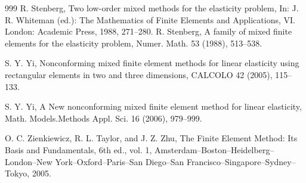 \documentclass{amsart}
\numberwithin{table}{section}
\numberwithin{figure}{section}
\begin{document}
\begin{thebibliography}{999}
     R. Stenberg, Two low-order mixed methods for the elasticity problem,
     In: J. R. Whiteman (ed.):
     The Mathematics of Finite Elements and Applications, VI. London:
     Academic Press, 1988, 271--280.
 R. Stenberg,
   A family of mixed finite elements for the elasticity problem,
    Numer. Math. 53 (1988),   513--538.



 S. Y. Yi,
    Nonconforming mixed finite element methods for
       linear elasticity using rectangular
     elements in two and three dimensions,
      CALCOLO 42 (2005), 115--133.

 S. Y. Yi,
    A New nonconforming mixed finite element method for linear elasticity,
    Math. Models.Methods Appl. Sci. 16 (2006),  979--999.

O. C. Zienkiewicz, R. L. Taylor, and  J. Z. Zhu, The Finite Element Method: Its  Basis and
         Fundamentals, 6th ed., vol. 1, Amsterdam--Boston--Heidelberg--London--New York--Oxford--Paris--San Diego--San Francisco--Singapore--Sydney--Tokyo, 2005.

\end{thebibliography}
\end{document}
